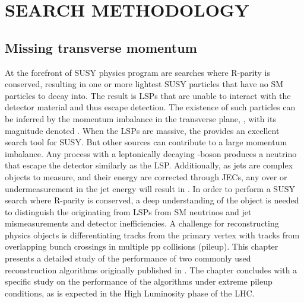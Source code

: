 \part{SEARCH METHODOLOGY}
\chapter{Missing transverse momentum}\label{sec:met}
\noindent\justify
At the forefront of SUSY physics program are searches where R-parity is conserved, resulting in one or more lightest SUSY particles that have no SM particles to decay into. 
The result is LSPs that are unable to interact with the detector material and thus escape detection.
The existence of such particles can be inferred by the momentum imbalance in the transverse plane, \ptvecmiss, with its magnitude denoted \ptmiss. 
When the LSPs are massive, the \ptmiss provides an excellent search tool for SUSY. But other sources can contribute to a large momentum imbalance. 
Any process with a leptonically decaying \PW-boson produces a neutrino that escape the detector similarly as the LSP. 
Additionally, as jets are complex objects to measure, and their energy are corrected through JECs, any over or undermeasurement in the jet energy will result in \ptmiss. 
In order to perform a SUSY search where R-parity is conserved, a deep understanding of the \ptmiss object is needed to distinguish the \ptmiss originating from LSPs from SM neutrinos and jet mismeasurements and detector inefficiencies. 
A challenge for reconstructing physics objects is differentiating tracks from the primary vertex with tracks from overlapping bunch crossings in multiple pp collisions (pileup).
\newpara
\noindent\justify
This chapter presents a detailed study of the performance of two commonly used \ptmiss reconstruction algorithms originally published in \cite{Sirunyan:2019kia}.
The chapter concludes with a specific study on the performance of the algorithms under extreme pileup conditions, as is expected in the High Luminosity phase of the LHC.    
\newpage
